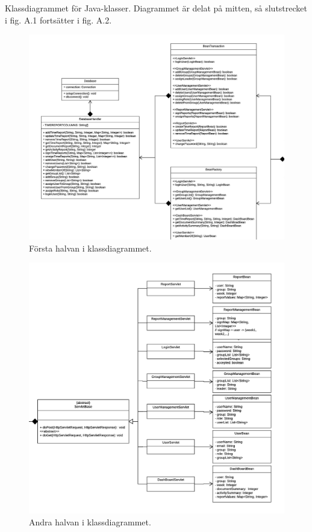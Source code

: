 \documentclass[paper=a4, fontsize=11pt,twoside]{article}
\begin{document}
Klassdiagrammet för Java-klasser. Diagrammet är delat på mitten, så slutstrecket i fig. A.1 fortsätter i fig. A.2.
\begin{figure}[H]
\centering
\includegraphics[width=13cm]{Klassdiagram1}
\caption{Första halvan i klassdiagrammet.}
\end{figure}
\begin{figure}[H]
\centering
\includegraphics[width=14cm]{Klassdiagram2}%
\caption{Andra halvan i klassdiagrammet.}
\end{figure}
\end{document}
